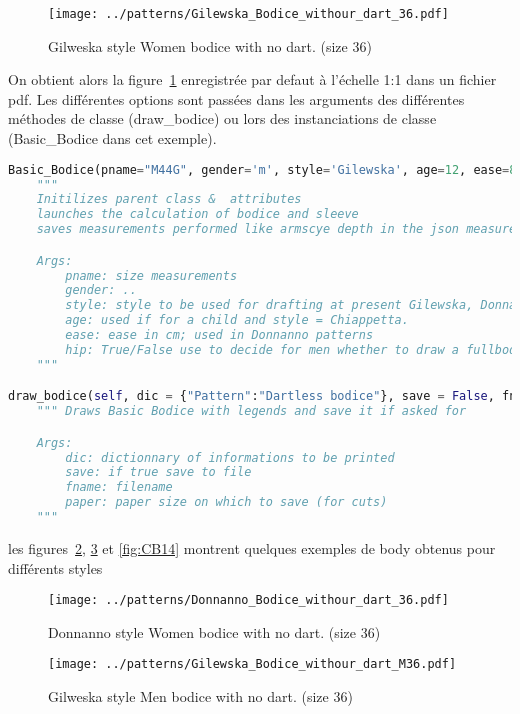 \documentclass[11pt,a4paper]{report}
\begin{document}
\begin{figure}[hbtp]
\centering
\texttt{[image: ../patterns/Gilewska\_Bodice\_withour\_dart\_36.pdf]}
\caption{Gilweska style Women bodice with no dart. (size 36)}
\label{fig:bodice_WG36}
\end{figure}

On obtient alors la figure~\ref{fig:bodice_WG36} enregistrée par defaut à l'échelle 1:1 dans un fichier pdf.
Les différentes options sont passées dans les arguments des différentes méthodes de classe (draw\_bodice) ou lors des instanciations de classe (Basic\_Bodice dans cet exemple).

\begin{lstlisting}[language=python]
Basic_Bodice(pname="M44G", gender='m', style='Gilewska', age=12, ease=8, hip=True):
	"""
	Initilizes parent class &  attributes
	launches the calculation of bodice and sleeve
	saves measurements performed like armscye depth in the json measurements file for further processing in other classes

	Args:
		pname: size measurements
		gender: ..
		style: style to be used for drafting at present Gilewska, Donnanno and Chiapetta (for kids)
		age: used if for a child and style = Chiappetta.
		ease: ease in cm; used in Donnanno patterns
		hip: True/False use to decide for men whether to draw a fullbodice
	"""

draw_bodice(self, dic = {"Pattern":"Dartless bodice"}, save = False, fname = None, paper='FullSize'):
	""" Draws Basic Bodice with legends and save it if asked for

	Args:
		dic: dictionnary of informations to be printed
		save: if true save to file
		fname: filename
		paper: paper size on which to save (for cuts)
	"""
\end{lstlisting}

les figures~\ref{fig:bodice_DW36}, \ref{fig:bodice_MG36} et \ref{fig:CB14} montrent quelques exemples de body obtenus pour différents styles


\begin{figure}[hbtp]
\centering
\texttt{[image: ../patterns/Donnanno\_Bodice\_withour\_dart\_36.pdf]}
\caption{Donnanno style Women bodice with no dart. (size 36)}
\label{fig:bodice_DW36}
\end{figure}

\begin{figure}[hbtp]
\centering
\texttt{[image: ../patterns/Gilewska\_Bodice\_withour\_dart\_M36.pdf]}
\caption{Gilweska style Men bodice with no dart. (size 36)}
\label{fig:bodice_MG36}
\end{figure}
\end{document}
